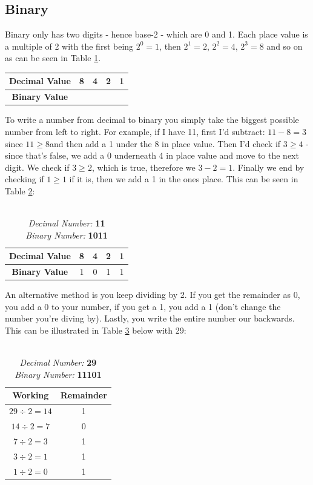 \documentclass[12pt,a4paper]{book}
\begin{document}
			\subsection{Binary}
				Binary only has two digits - hence base-2 - which are 0 and 1. Each place value is a multiple of 2 with the first being $2^{0}=1$, then $2^{1}=2$, $2^{2}=4$, $2^{3}=8$ and so on as can be seen in Table \ref{tab:binary1}.
				\begin{table}[H]
					\centering
					\label{tab:binary1}
					\begin{tabular}{c||c|c|c|c|}
						\textbf{Decimal Value} & 8 & 4 & 2 & 1 \\
						\hline
						\textbf{Binary Value} & & & & 
					\end{tabular}
				\end{table}	
				To write a number from decimal to binary you simply take the biggest possible number from left to right. For example, if I have 11, first I'd subtract: $11-8=3$ since $11\geq8$and then add a 1 under the 8 in place value. Then I'd check if $3\geq4$ - since that's false, we add a 0 underneath 4 in place value and move to the next digit. We check if $3\geq2$, which is true, therefore we $3-2=1$. Finally we end by checking if $1\geq1$ if it is, then we add a 1 in the ones place. This can be seen in Table \ref{tab:binary2}:
				
				\begin{table}[H]
					\centering
					\label{tab:binary2}
					\begin{tabular}{c||c|c|c|c|}
						\textbf{Decimal Value} & 8 & 4 & 2 & 1 \\
						\hline
						\textbf{Binary Value} & 1 & 0 & 1 & 1 \\
					\end{tabular}
				\caption{ \\
					\textit{Decimal Number:} \textbf{11} \\ \textit{Binary Number:} \textbf{1011}}
				\end{table}	
				
				An alternative method is you keep dividing by 2. If you get the remainder as 0, you add a 0 to your number, if you get a 1, you add a 1 (don't change the number you're diving by). Lastly, you write the entire number our backwards. This can be illustrated in Table \ref{tab:binary3} below with 29:
				\begin{table}[H]
					\centering
					\label{tab:binary3}
					\begin{tabular}{c|c}
						\textbf{Working} & \textbf{Remainder} \\
						\hline
						$29\div2=14$ & 1 \\
						$14\div2=7$ & 0 \\
						$7\div2=3$ & 1 \\
						$3\div2=1$ & 1 \\
						$1\div2=0$ & 1 \\
					\end{tabular}
					\caption{ \\
						\textit{Decimal Number:} \textbf{29} \\ \textit{Binary Number:} \textbf{11101}}
				\end{table}	
				
\end{document}
